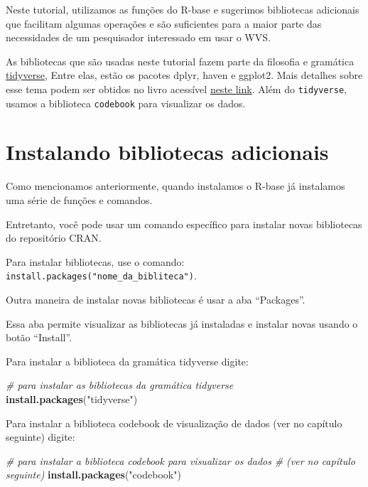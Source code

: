 \documentclass[
  10pt,
  brazil,
  a4paper,
  twoside, notitlepage, openright]{book}
\newenvironment{Shaded}{\begin{snugshade}}{\end{snugshade}}
\newcommand{\CommentTok}[1]{\textcolor[rgb]{0.56,0.35,0.01}{\textit{#1}}}
\newcommand{\KeywordTok}[1]{\textcolor[rgb]{0.13,0.29,0.53}{\textbf{#1}}}
\newcommand{\NormalTok}[1]{#1}
\newcommand{\StringTok}[1]{\textcolor[rgb]{0.31,0.60,0.02}{#1}}
\begin{document}
Neste tutorial, utilizamos as funções do R-base e sugerimos bibliotecas adicionais que facilitam algumas operações e são suficientes para a maior parte das necessidades de um pesquisador interessado em usar o WVS.

As bibliotecas que são usadas neste tutorial fazem parte da filosofia e gramática \href{https://www.tidyverse.org/}{tidyverse}, Entre elas, estão os pacotes dplyr, haven e ggplot2. Mais detalhes sobre esse tema podem ser obtidos no livro acessível \href{https://r4ds.had.co.nz/}{neste link}. Além do \texttt{tidyverse}, usamos a biblioteca \texttt{codebook} para visualizar os dados.

\hypertarget{instalando-bibliotecas-adicionais}{%
\section{Instalando bibliotecas adicionais}\label{instalando-bibliotecas-adicionais}}

Como mencionamos anteriormente, quando instalamos o R-base já instalamos uma série de funções e comandos.

Entretanto, você pode usar um comando específico para instalar novas bibliotecas do repositório CRAN.

Para instalar bibliotecas, use o comando: \texttt{install.packages("nome\_da\_bibliteca")}.

Outra maneira de instalar novas bibliotecas é usar a aba ``Packages''.

Essa aba permite visualizar as bibliotecas já instaladas e instalar novas usando o botão ``Install''.

Para instalar a biblioteca da gramática tidyverse digite:

\begin{Shaded}
\begin{Highlighting}[]
\CommentTok{# para instalar as bibliotecas da gramática tidyverse}
\KeywordTok{install.packages}\NormalTok{(}\StringTok{"tidyverse"}\NormalTok{)}
\end{Highlighting}
\end{Shaded}

Para instalar a biblioteca codebook de visualização de dados (ver no capítulo seguinte) digite:

\begin{Shaded}
\begin{Highlighting}[]
\CommentTok{# para instalar a biblioteca codebook para visualizar os dados }
\CommentTok{# (ver no capítulo seguinte)}
\KeywordTok{install.packages}\NormalTok{(}\StringTok{"codebook"}\NormalTok{)}
\end{Highlighting}
\end{Shaded}
\end{document}
